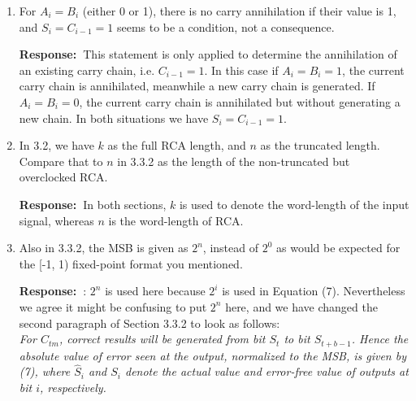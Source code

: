 \documentclass[a4paper, 11pt]{article}
\def\Response{\noindent \textbf{Response:~}}
\newcommand{\Question}[1]{\textcolor[rgb]{0.51,0.00,0.00}{#1}}
\newcommand{\PaperText}[1]{\emph{#1}}
\begin{document}
\begin{enumerate}
      \Response Thanks for pointing this out. In this case it should be $C_{i-1} =1$, because carry is propagated from bit $i-1$ to bit $i$. Hence $S_i=A_i+B_i+C_{i-1}=0$.
      
      This statement is modified as follows:\\
      
      \PaperText{Carry propagation: $A_i\neq B_i$, the carry propagates for this carry at bit $i$, and $C_{i-1}=1$, $S_i=0$.}\\
      
  \item \Question{For $A_i = B_i$ (either 0 or 1), there is no carry annihilation if their value is 1, and $S_i = C_{i-1} = 1$ seems to be a condition, not a consequence.}
      
      \Response This statement is only applied to determine the annihilation of an existing carry chain, i.e. $C_{i-1}=1$. In this case if $A_i=B_i=1$, the current carry chain is annihilated, meanwhile a new carry chain is generated. If $A_i=B_i=0$, the current carry chain is annihilated but without generating a new chain. In both situations we have $S_i=C_{i-1}=1$.\\

  \item \Question{In 3.2, we have $k$ as the full RCA length, and $n$ as the truncated length.  Compare that to $n$ in 3.3.2 as the length of the non-truncated but overclocked RCA.}
      
      \Response In both sections, $k$ is used to denote the word-length of the input signal, whereas $n$ is the word-length of RCA.\\
      
  \item \Question{Also in 3.3.2, the MSB is given as $2^n$, instead of $2^0$ as would be expected for the [-1, 1) fixed-point format you mentioned.}
      
      \Response : $2^n$ is used here because $2^i$ is used in Equation (7). Nevertheless we agree it might be confusing to put $2^n$ here, and we have changed the second paragraph of Section 3.3.2 to look as follows:\\
      
      
      \PaperText{For $C_{tm}$, correct results will be generated from bit $S_t$ to bit $S_{t+b-1}$. Hence the absolute value of error seen at the output, normalized to the MSB, is given by (7), where $\hat{S}_i$ and $S_i$ denote the actual value and error-free value of outputs at bit $i$, respectively.}\\
      

\end{enumerate}
\end{document}
